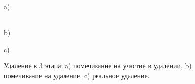 \documentclass[12pt]{article}
\begin{document}
{\begin{figure}[h]
\begin{minipage}[h]{0.45\linewidth}
						 a) \\
					\end{minipage}
					\hfill
					\begin{minipage}[h]{0.45\linewidth}
						 \\b)
					\end{minipage}
					\vfill
					\begin{minipage}[h]{0.45\linewidth}
						 c) \\
					\end{minipage}
					\caption{Удаление в 3 этапа: a) помечивание на участие в удалении, b) помечивание на удаление, c) реальное удаление.}
				\end{figure}
}
\end{document}
